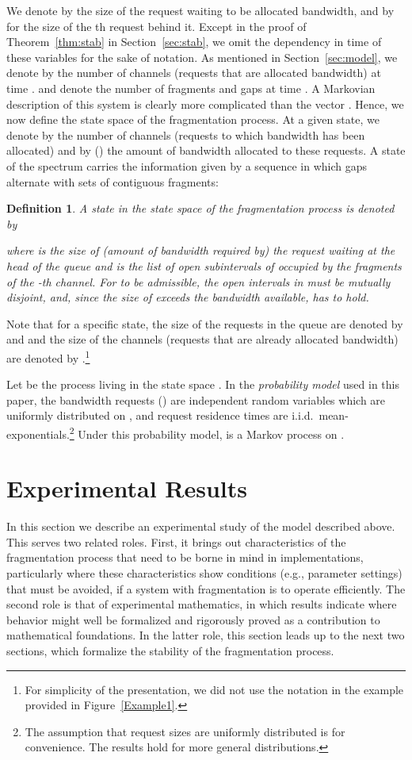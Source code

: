 \documentclass{amsart}
\newtheorem{defi}{Definition}
\begin{document}
We denote by  the size of the request waiting to be allocated bandwidth, and by  for  the size of the th request behind it. Except in the proof of Theorem~\ref{thm:stab} in Section~\ref{sec:stab}, we omit the dependency in time of these variables for the sake of notation.
As mentioned in Section~\ref{sec:model}, we denote by  the number of channels (requests that are allocated bandwidth) at time .  and  denote the number of fragments and gaps at time .  A
Markovian description of  this system is clearly more complicated  than the vector .  Hence, we now define the state space of the fragmentation process. At a given state, we denote by  the number of channels (requests to which bandwidth has been allocated) and by  () the amount of bandwidth allocated to these requests. A state of the spectrum  carries  the information given by a sequence in which gaps
alternate with  sets of  contiguous fragments:
\begin{defi}
A state  in the state space  of the fragmentation process is denoted by

where  is the size  of (amount of bandwidth required by) the request waiting at the head of the queue and  is the list of open subintervals of 
occupied by  the fragments of the  -th channel.  For  to  be admissible, the
open intervals  in  must  be mutually disjoint,  and, since  the size  of 
exceeds the bandwidth available,  has to hold. \end{defi}
Note that for a specific state, the size of the requests in the queue are denoted by  and  and the size of the channels (requests that are already allocated bandwidth) are denoted by .\footnote{For simplicity of the presentation, we did not use the notation  in the example provided in Figure~\ref{Example1}.}

Let  be the process living in the state space . In the \emph{probability model} used in this paper, the bandwidth requests () are  independent random variables which are uniformly distributed  on , and request residence times are i.i.d.\ mean- exponentials.\footnote{The assumption that request sizes are uniformly distributed is for convenience. The results hold for more general distributions.} Under this probability model,  is a Markov process on .


\section{Experimental Results}\label{sec:expr}

In this section we describe an experimental study of the model described above. This serves
two related roles. First, it brings out characteristics of the
fragmentation process that need to be borne in mind in
implementations, particularly where these characteristics show
conditions (e.g., parameter settings) that must be avoided, if a
system with fragmentation is to operate efficiently. The second role
is that of experimental mathematics, in which results indicate where
behavior might well be formalized and rigorously proved as a
contribution to mathematical foundations.  In the latter role, this
section leads up to the next two sections, which formalize the stability
of the  fragmentation process.
\end{document}
